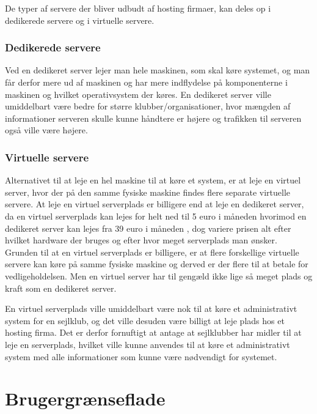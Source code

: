 De typer af servere der bliver udbudt af hosting firmaer, kan deles op i dedikerede servere og i virtuelle servere.


\subsubsection*{Dedikerede servere}

Ved en dedikeret server lejer man hele maskinen, som skal køre systemet, og man får derfor mere ud af maskinen og har mere
indflydelse på komponenterne i maskinen og hvilket operativsystem der køres. En dedikeret server ville umiddelbart være
bedre for større klubber/organisationer, hvor mængden af informationer serveren skulle kunne håndtere er højere og
trafikken til serveren også ville være højere. \citep{server}


\subsubsection*{Virtuelle servere}

Alternativet til at leje en hel maskine til at køre et system, er at leje en virtuel server, hvor der på den samme
fysiske maskine findes flere separate virtuelle servere. At leje en virtuel serverplads er billigere end at leje en
dedikeret server, da en virtuel serverplads kan lejes for helt ned til 5 euro i måneden\citep{Virtuelserver} hvorimod en
dedikeret server kan lejes fra 39 euro i måneden \citep{Dedikeretserver}, dog variere prisen alt efter hvilket hardware
der bruges og efter hvor meget serverplads man ønsker. Grunden til at en virtuel serverplads er billigere, er at
flere forskellige virtuelle servere kan køre på samme fysiske maskine og derved er der flere til at betale for
vedligeholdelsen. Men en virtuel server har til gengæld ikke lige så meget plads og kraft som en dedikeret
server.\citep{server}

En virtuel serverplads ville umiddelbart være nok til at køre et administrativt system for en sejlklub, og det ville
desuden være billigt at leje plads hos et hosting firma. Det er derfor fornuftigt at antage at sejlklubber har
midler til at leje en serverplads, hvilket ville kunne anvendes til at køre et administrativt system med alle
informationer som kunne være nødvendigt for systemet.


\section{Brugergrænseflade}

